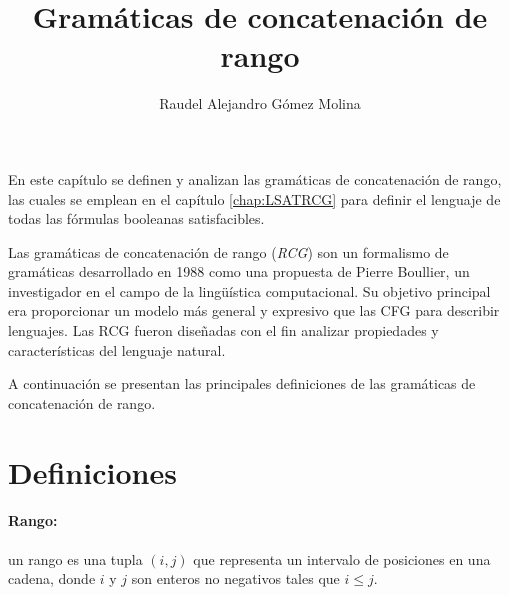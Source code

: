 \documentclass[12pt]{article}
\title{Gramáticas de concatenación de rango}
\author{Raudel Alejandro Gómez Molina}
\begin{document}
\maketitle






En este capítulo se definen y analizan las gramáticas de concatenación de rango, las cuales se emplean en el
capítulo \ref{chap:LSATRCG} para definir el lenguaje de todas las fórmulas booleanas satisfacibles.

Las gramáticas de concatenación de rango (\textit{RCG}) \cite{mainRCGBib} son un formalismo de gramáticas desarrollado
en 1988 como una propuesta de Pierre Boullier, un investigador en el campo de la lingüística computacional. Su
objetivo principal era proporcionar un modelo más general y expresivo que las CFG para describir lenguajes.
Las RCG fueron diseñadas con el fin analizar propiedades y características del lenguaje natural.

A continuación se presentan las principales definiciones de las gramáticas de concatenación de rango.

\section{Definiciones}

\paragraph{Rango:} un rango es una tupla $(i, j)$ que representa un intervalo de posiciones en una cadena, donde $i$ y $j$ son enteros no negativos tales que $i \leq j$.
\end{document}
